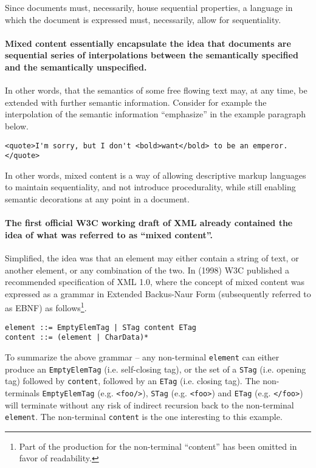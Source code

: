 \documentclass{scrreprt}
\begin{document}
Since documents must, necessarily, house sequential properties, a language in which the document is expressed must, necessarily, allow for sequentiality.

\paragraph{Mixed content essentially encapsulate the idea that documents are sequential series of interpolations between the semantically specified and the semantically unspecified.} In other words, that the semantics of some free flowing text may, at any time, be extended with further semantic information. Consider for example the interpolation of the semantic information ``emphasize'' in the example paragraph below.

\begin{lstlisting}
<quote>I'm sorry, but I don't <bold>want</bold> to be an emperor.</quote>
\end{lstlisting}

In other words, mixed content is a way of allowing descriptive markup languages to maintain sequentiality, and not introduce procedurality, while still enabling semantic decorations at any point in a document.


\paragraph{The first official W3C working draft\citep{xmlFirstWorkingDraft} of XML already contained the idea of what was referred to as ``mixed content''.} Simplified, the idea was that an element may either contain a string of text, or another element, or any combination of the two. In (1998) W3C published a recommended specification of XML 1.0, where the concept of mixed content was expressed as a grammar in Extended Backus-Naur Form (subsequently referred to as EBNF) as follows\footnote{ Part of the production for the non-terminal ``content'' has been omitted in favor of readability.}.

\begin{lstlisting}
element ::= EmptyElemTag | STag content ETag 
content ::= (element | CharData)*
\end{lstlisting}

To summarize the above grammar -- any non-terminal \texttt{element} can either produce an \texttt{EmptyElemTag} (i.e. self-closing tag), or the set of a \texttt{STag} (i.e. opening tag) followed by \texttt{content}, followed by an \texttt{ETag} (i.e. closing tag). The non-terminals \texttt{EmptyElemTag} (e.g. \texttt{<foo/>}), \texttt{STag} (e.g. \texttt{<foo>}) and \texttt{ETag} (e.g. \texttt{</foo>}) will terminate without any risk of indirect recursion back to the non-terminal \texttt{element}. The non-terminal \texttt{content} is the one interesting to this example.
\end{document}
